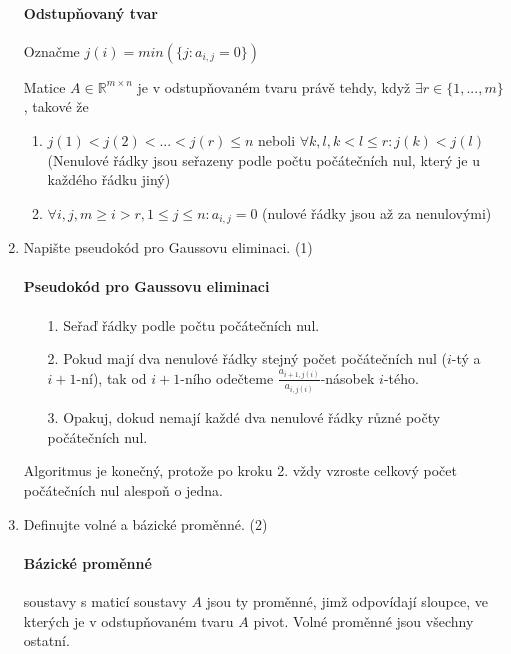 \documentclass[10pt,a4paper]{article}
\begin{document}
\begin{enumerate}
\paragraph{Odstupňovaný tvar}

Označme $j(i) = min(\{j: a_{i,j} = 0\})$

Matice $A \in \mathbb{R}^{m \times n}$ je v odstupňovaném tvaru právě tehdy, když $\exists r \in \{1, ..., m \}$, takové že

\begin{enumerate}
\item $j(1) < j(2) < ... < j(r) \leq n$  neboli $\forall k,l, k < l \leq r: j(k) < j(l)$ (Nenulové řádky jsou seřazeny podle počtu počátečních nul, který je u každého řádku jiný)
\item $\forall i,j,  m \geq i > r, 1 \leq j \leq n: a_{i, j} = 0$ (nulové řádky jsou až za nenulovými)
\end{enumerate}

\item Napište pseudokód pro Gaussovu eliminaci. (1)

\paragraph{Pseudokód pro Gaussovu eliminaci}

\begin{enumerate}
\item[1.] Seřaď řádky podle počtu počátečních nul.
\item[2.] Pokud mají dva nenulové řádky stejný počet počátečních nul ($i$-tý a $i+1$-ní), tak od $i+1$-ního odečteme $\frac{a_{i+1, j(i)}}{a_{i, j(i)}}$-násobek $i$-tého.
\item[3.] Opakuj, dokud nemají každé dva nenulové řádky různé počty počátečních nul.
\end{enumerate}

Algoritmus je konečný, protože po kroku 2. vždy vzroste celkový počet počátečních nul alespoň o jedna.

\item Definujte volné a bázické proměnné. (2)

\paragraph{Bázické proměnné} soustavy s maticí soustavy $A$ jsou ty proměnné, jimž odpovídají sloupce, ve kterých je v odstupňovaném tvaru $A$ pivot. Volné proměnné jsou všechny ostatní.


\end{enumerate}
\end{document}

